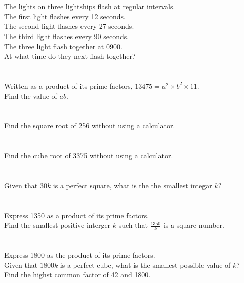 \documentclass[12pt,a4paper]{article}
\begin{document}
\section{}
The lights on three lightships flash at regular intervals.\\
The first light flashes every 12 seconds.\\
The second light flashes every 27 seconds.\\
The third light flashes every 90 seconds.\\
The three light flash together at 0900.\\
At what time do they next flash together?

\section{}
Written as a product of its prime factors, \(13475=a^2\times b^2\times11\).\\
Find the value of \(ab\).

\section{}
Find the square root of 256 without using a calculator.

\section{}
Find the cube root of 3375 without using a calculator.

\section{}
Given that \(30k\) is a perfect square, what is the the smallest integar \(k\)?

\section{}
Express 1350 as a product of its prime factors.\\
Find the smallest positive interger \(k\) such that \(\frac{1350}k\) is a square number.

\section{}
Express 1800 as the product of its prime factors.\\
Given that \(1800k\) is a perfect cube, what is the smallest possible value of \(k\)?\\
Find the highst common factor of 42 and 1800.
\end{document}
